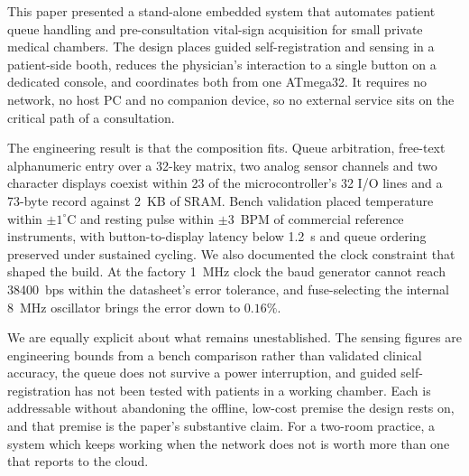 This paper presented a stand-alone embedded system that automates patient queue handling and
pre-consultation vital-sign acquisition for small private medical chambers. The design places
guided self-registration and sensing in a patient-side booth, reduces the physician's interaction
to a single button on a dedicated console, and coordinates both from one ATmega32. It requires no
network, no host PC and no companion device, so no external service sits on the critical path of a
consultation.

The engineering result is that the composition fits. Queue arbitration, free-text alphanumeric
entry over a 32-key matrix, two analog sensor channels and two character displays coexist within 23
of the microcontroller's 32 I/O lines and a 73-byte record against 2~KB of SRAM. Bench validation
placed temperature within $\pm 1^{\circ}$C and resting pulse within $\pm 3$~BPM of commercial
reference instruments, with button-to-display latency below 1.2~s and queue ordering preserved
under sustained cycling. We also documented the clock constraint that shaped the build. At the
factory 1~MHz clock the baud generator cannot reach 38400~bps within the datasheet's error
tolerance, and fuse-selecting the internal 8~MHz oscillator brings the error down to $0.16\%$.

We are equally explicit about what remains unestablished. The sensing figures are engineering bounds
from a bench comparison rather than validated clinical accuracy, the queue does not survive a power
interruption, and guided self-registration has not been tested with patients in a working chamber.
Each is addressable without abandoning the offline, low-cost premise the design rests on, and that
premise is the paper's substantive claim. For a two-room practice, a system which keeps working when
the network does not is worth more than one that reports to the cloud.

